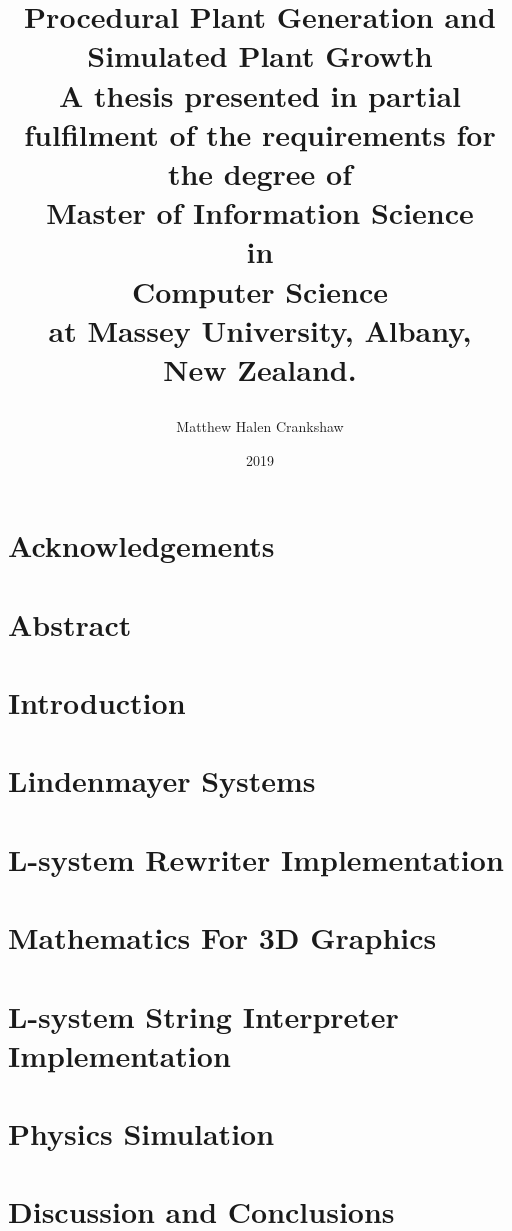 \documentclass[11pt, twoside]{report}
\title{
{\huge \textbf{Procedural Plant Generation and Simulated Plant Growth }}\\
\vspace{3cm}
{\large A thesis presented in partial fulfilment of the requirements for the degree of \\
\vspace{4cm}
\large \textbf{Master of Information Science}\\
\large \textbf{in}\\
\large \textbf{Computer Science}\\
\vspace{4cm}
\large at Massey University, Albany, \\
\large New Zealand. }
\vspace{3cm}
\author{Matthew Halen Crankshaw}
\date{2019}
}
\begin{document}
\maketitle

\chapter*{Acknowledgements}


\chapter*{Abstract}


\tableofcontents
\listoffigures
\listoftables


\chapter{Introduction}


\chapter{Lindenmayer Systems}  \label{l-system chapter} 


\chapter{L-system Rewriter Implementation}


\chapter{Mathematics For 3D Graphics} \label{maths chapter}


\chapter{L-system String Interpreter Implementation} \label{interpreter implementation}


\chapter{Physics Simulation} \label{physics chapter}


\chapter{Discussion and Conclusions}


\printglossary[type=\acronymtype]
\printglossary

\begin{appendices}

\end{appendices}
\end{document}
